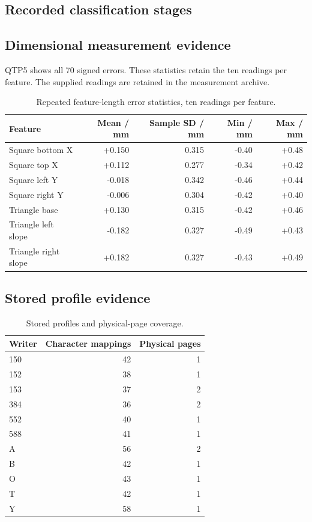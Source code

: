 \subsection{Recorded classification stages}\label{app:res-classification-time}

\subsection{Dimensional measurement evidence}\label{app:res-geometry-calculation}
QTP5 shows all 70 signed errors. These statistics retain the ten readings per feature. The supplied readings are retained in the measurement archive.
\begin{table}[H]\centering\small
\begin{tabular}{lrrrr}
\toprule Feature & Mean / mm & Sample SD / mm & Min / mm & Max / mm\\\midrule
Square bottom X & +0.150 & 0.315 & -0.40 & +0.48\\
Square top X & +0.112 & 0.277 & -0.34 & +0.42\\
Square left Y & -0.018 & 0.342 & -0.46 & +0.44\\
Square right Y & -0.006 & 0.304 & -0.42 & +0.40\\
Triangle base & +0.130 & 0.315 & -0.42 & +0.46\\
Triangle left slope & -0.182 & 0.327 & -0.49 & +0.43\\
Triangle right slope & +0.182 & 0.327 & -0.43 & +0.49\\
\bottomrule\end{tabular}
\caption{Repeated feature-length error statistics, ten readings per feature.}\label{tab:app-gantry-features}\end{table}
\subsection{Stored profile evidence}\label{app:res-inventory}
\begin{table}[H]\centering\small
\begin{tabular}{lrr}
\toprule Writer & Character mappings & Physical pages\\\midrule
150 & 42 & 1\\
152 & 38 & 1\\
153 & 37 & 2\\
384 & 36 & 2\\
552 & 40 & 1\\
588 & 41 & 1\\
A & 56 & 2\\
B & 42 & 1\\
O & 43 & 1\\
T & 42 & 1\\
Y & 58 & 1\\
\bottomrule\end{tabular}
\caption{Stored profiles and physical-page coverage.}\label{tab:app-style-inventory}\end{table}
